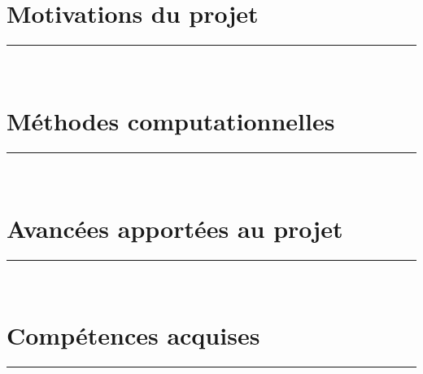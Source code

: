 \author{
{\FirstNameA\ \AuthorA{}}, 
{\FirstNameB\ \AuthorB{}}
}


\conference{\Conference}
 
\maketitle

\begin{multicols}{3}

\section*{Motivations du projet}
\rule[40ex]{\linewidth}{3pt}\\
\ParagMotiv
\columnbreak

\section*{Méthodes computationnelles}
\rule[40ex]{\linewidth}{3pt}\\
\ParagMethComp
\columnbreak

\section*{Avancées apportées au projet}
\rule[40ex]{\linewidth}{3pt}\\
\ParagAmelio

\section*{Compétences acquises}
\rule[40ex]{\linewidth}{3pt}\\
\ParagCompAcqu

\end{multicols}

